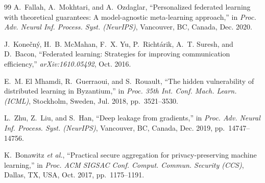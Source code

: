 \documentclass[journal,10pt]{IEEEtran}
\begin{document}
\begin{thebibliography}{99}
A.~Fallah, A.~Mokhtari, and A.~Ozdaglar, ``Personalized federated learning with theoretical guarantees: A model-agnostic meta-learning approach,'' in \emph{Proc. Adv. Neural Inf. Process. Syst. (NeurIPS)}, Vancouver, BC, Canada, Dec. 2020.

J.~Konečný, H.~B. McMahan, F.~X. Yu, P.~Richtárik, A.~T. Suresh, and D.~Bacon, ``Federated learning: Strategies for improving communication efficiency,'' \emph{arXiv:1610.05492}, Oct. 2016.

E.~M. El Mhamdi, R.~Guerraoui, and S.~Rouault, ``The hidden vulnerability of distributed learning in Byzantium,'' in \emph{Proc. 35th Int. Conf. Mach. Learn. (ICML)}, Stockholm, Sweden, Jul. 2018, pp.~3521--3530.

L.~Zhu, Z.~Liu, and S.~Han, ``Deep leakage from gradients,'' in \emph{Proc. Adv. Neural Inf. Process. Syst. (NeurIPS)}, Vancouver, BC, Canada, Dec. 2019, pp.~14747--14756.

K.~Bonawitz \emph{et al.}, ``Practical secure aggregation for privacy-preserving machine learning,'' in \emph{Proc. ACM SIGSAC Conf. Comput. Commun. Security (CCS)}, Dallas, TX, USA, Oct. 2017, pp.~1175--1191.

\end{thebibliography}
\end{document}
